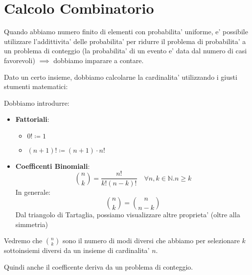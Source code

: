 % 
\chapter{Calcolo Combinatorio}  

Quando abbiamo numero finito di elementi con probabilita' uniforme, e' possibile utilizzare l'addittivita' delle probabilita' per ridurre il problema di probabilita' a un problema di conteggio (la probabilita' di un evento e' data dal numero di casi favorevoli) $ \implies $ dobbiamo imparare a contare.

Dato un certo insieme, dobbiamo calcolarne la cardinalita' utilizzando i giusti stumenti matematici:


Dobbiamo introdurre:
\begin{itemize}
\item \textbf{Fattoriali}:
  \begin{itemize}
  \item $ 0! \coloneq 1 $
  \item $ (n+1)! \coloneq (n+1) \cdot n! $
  \end{itemize}
  \item \textbf{Coefficenti Binomiali}:
    \[
      \binom{n}{k} = \frac{n!}{k! (n-k)!} \quad \forall n,k\in \mathbb{N}. n \geq k
    \]
    In generale:
    \[
      \binom{n}{k} = \binom{n}{n-k}
    \]
    Dal triangolo di Tartaglia, possiamo visualizzare altre proprieta' (oltre alla simmetria)
\end{itemize}

Vedremo che $ \binom{n}{k} $ sono il numero di modi diversi che abbiamo per selezionare $ k $ sottoinsiemi diversi da un insieme di cardinalita' $ n $.


Quindi anche il coefficente deriva da un problema di conteggio.


